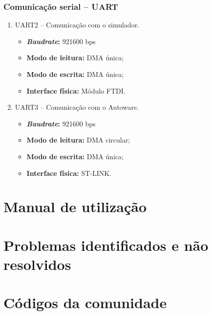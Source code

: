 \subsubsection*{Comunicação serial -- UART}

	\begin{enumerate}
		\item UART2 -- Comunicação com o simulador.
		\begin{itemize}
			\item \textbf{\textit{Baudrate}:} 921600 bps
			\item \textbf{Modo de leitura:} DMA única;
			\item \textbf{Modo de escrita:} DMA única;
			\item \textbf{Interface física:} Módulo FTDI.	
		\end{itemize}
	
		\item UART3 -- Comunicação com o Autoware.
		\begin{itemize}
			\item \textbf{\textit{Baudrate}:} 921600 bps
			\item \textbf{Modo de leitura:} DMA circular;
			\item \textbf{Modo de escrita:} DMA única;
			\item \textbf{Interface física:} ST-LINK.		
		\end{itemize}	
	
	\end{enumerate}

\clearpage

\section{Manual de utilização}



\clearpage


\section{Problemas identificados e não resolvidos}



\clearpage


\section{Códigos da comunidade}